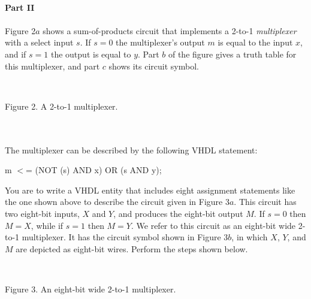 \documentclass[psfig,10pt,fullpage]{article}
\begin{document}
~\\
\noindent
{\bf Part II}
~\\
~\\
\noindent
Figure 2$a$ shows a sum-of-products circuit that implements
a 2-to-1 {\it multiplexer} with a select input $s$.
If $s = 0$ the multiplexer's output $m$ is equal to the input $x$, and if $s=1$ the
output is equal to $y$. Part $b$ of the figure gives a truth table for this
multiplexer, and part $c$ shows its circuit symbol. 

\begin{figure}[H]
\scriptsize
\centerline{
\hbox{}}
\end{figure}
~\\
\centerline{Figure 2.  A 2-to-1 multiplexer.}
~\\
~\\

The multiplexer can be described by the following VHDL statement:

\begin{center}
\begin{minipage}[t]{12.5 cm}
\begin{tabbing}
m $<$= (NOT (s) AND x) OR (s AND y);
\end{tabbing}
\end{minipage}
\end{center}

You are to write a VHDL entity that includes eight
assignment statements like the one shown above to describe the circuit given in Figure
3$a$. This circuit has two eight-bit inputs, $X$ and $Y$, and produces the eight-bit output
$M$. If $s=0$ then $M = X$, while if $s=1$ then $M=Y$. We refer to this circuit as an eight-bit
wide 2-to-1 multiplexer. It has the circuit symbol shown in Figure 3$b$, in which $X$,
$Y$, and $M$ are depicted as eight-bit wires. Perform the steps shown below.

\begin{figure}[H]
\scriptsize
\centerline{
\hbox{}}
\end{figure}
~\\
\centerline{Figure 3.  An eight-bit wide 2-to-1 multiplexer.}
~\\
\end{document}

